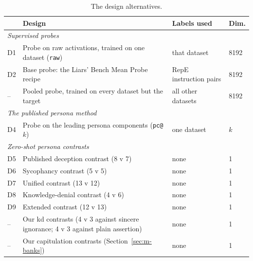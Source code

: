 \begin{table}[t]
\centering
\footnotesize
\caption{The design alternatives.}
\label{tab:m-alternatives}
\begin{tabular}{p{7mm}p{62mm}p{34mm}p{10mm}}
\hline
 & Design & Labels used & Dim. \\
\hline
\multicolumn{4}{l}{\emph{Supervised probes}} \\
D1 & Probe on raw activations, trained on one dataset (\texttt{raw}) & that dataset & 8192 \\
D2 & Base probe: the Liars' Bench Mean Probe recipe & RepE instruction pairs & 8192 \\
-- & Pooled probe, trained on every dataset but the target & all other datasets & 8192 \\
\multicolumn{4}{l}{\emph{The published persona method}} \\
D4 & Probe on the leading persona components (\texttt{pc@}$k$) & one dataset & $k$ \\
\multicolumn{4}{l}{\emph{Zero-shot persona contrasts}} \\
D5 & Published deception contrast (8 v 7) & none & 1 \\
D6 & Sycophancy contrast (5 v 5) & none & 1 \\
D7 & Unified contrast (13 v 12) & none & 1 \\
D8 & Knowledge-denial contrast (4 v 6) & none & 1 \\
D9 & Extended contrast (12 v 13) & none & 1 \\
-- & Our kd contrasts (4 v 3 against sincere ignorance; 4 v 3 against plain assertion) & none & 1 \\
-- & Our capitulation contrasts (Section~\ref{sec:m-banks}) & none & 1 \\
\hline
\end{tabular}
\end{table}

